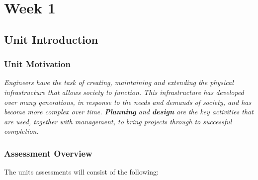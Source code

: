 \documentclass{report}
\begin{document}
	
	\thispagestyle{empty}
	\newpage%
	\tableofcontents
	\chapter{Week 1}
	
	
	\section{Unit Introduction}
	\subsection{Unit Motivation}
	\textit{Engineers have the task of creating, maintaining and extending the physical infrastructure that allows society to function. This infrastructure has developed over many generations, in response to the needs and demands of society, and has become more complex over time. \textbf{Planning} and \textbf{design} are the key activities that are used, together with management, to bring projects through to successful completion.}
	

	\subsection{Assessment Overview}
	The units assessments will consist of the following:
\end{document}
